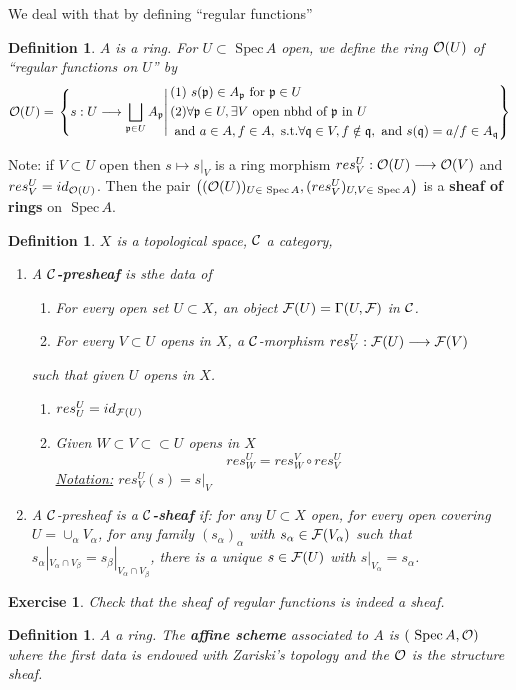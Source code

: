 \documentclass[11pt]{article}
\newtheorem{dfn}[thm]{Definition}
\newtheorem{exercise}[thm]{Exercise}
\newcommand{\spec}{\text{ Spec}\,}
\newcommand{\scp}{{\mathfrak p}}
\newcommand{\scq}{\mathfrak q}
\newcommand{\calf}{{\cal F}}
\newcommand{\calc}{{\cal C}}
\newcommand{\calo}{{\cal O}}
\newcommand{\lrta}{\longrightarrow}
\begin{document}
We deal with that by defining ``regular functions''
\begin{dfn}
$A$ is a ring. For $U\subset \spec A$ open, we define the ring $\calo(U)$ of ``regular functions on $U$'' by 
$$
\calo(U)=\left.\left\{s:U\lrta \bigsqcup_{\scp\in U}A_\scp\right| \begin{aligned}
& \text{(1) $s(\scp)\in A_\scp$ for $\scp \in U$}\\
&\text{(2)} \forall \scp\in U, \exists V \text{ open  nbhd of } \scp \text{ in } U\\
& \text{ and } a\in A, f\in A, \text{ s.t.} \forall \scq\in V, f\notin \scq, \text{ and } s(\scq)=a/f\in A_\scq
\end{aligned}\right\}
$$
\end{dfn}
Note: if $V\subset U$ open then $s\mapsto s|_V$ is a ring morphism $res^U_V:\calo(U)\lrta \calo(V)$ and $res^U_V=id_{\calo(U)}$. Then the pair $\left((\calo(U))_{U\in\spec A}, (res^U_V)_{U,V\in \spec A}\right)$ is a \textbf{ sheaf of rings } on $\spec A$. 
\begin{dfn}
$X$ is a topological space, $\calc$ a category,
\begin{enumerate}[label=(\arabic*)]
\item A \textbf{$\calc$-presheaf} is sthe data of 
\begin{enumerate}[label=(\alph*)]
\item For every open set $U\subset X$, an object $\calf(U)=\Gamma(U,\calf)$ in $\calc$.
\item For every $V\subset U$ opens in $X$, a $\calc$-morphism $res^U_V: \calf(U)\lrta \calf(V)$
\end{enumerate}
such that given $U$ opens in $X$.
\begin{enumerate}[label=(\roman*)]
\item $res^U_U=id_{\calf(U)}$
\item Given $W\subset V\subset \subset U$ opens in $X$
$$
res^U_W=res^V_W\circ res^U_V
$$
\underline{Notation:} $res^U_V(s)=s|_V$
\end{enumerate}

\item A $\calc$-presheaf is a \textbf{$\calc$-sheaf} if: for any $U\subset X$ open, for every open covering $U=\cup_\alpha V_\alpha$, for any family $(s_\alpha)_\alpha$ with $s_\alpha\in \calf(V_\alpha)$ such that $s_\alpha|_{V_\alpha\cap V_\beta}=s_{\beta}|_{V_\alpha\cap V_\beta}$, there is a unique $s\in \calf(U)$ with $s|_{V_\alpha}=s_\alpha$.
\end{enumerate}
\end{dfn}
\begin{exercise}
Check that the sheaf of regular functions is indeed a sheaf.
\end{exercise}
\begin{dfn}
$A$ a ring. The \textbf{affine scheme} associated to $A$ is $(\spec A,\calo)$ where the first data is endowed with Zariski's topology and the $\calo$ is the structure sheaf.
\end{dfn}
\end{document}
